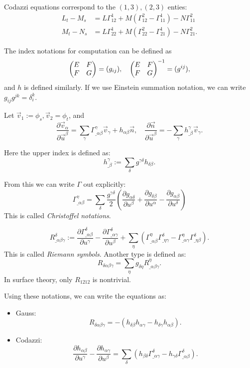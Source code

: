 Codazzi equations correspond to the $(1,3),(2,3)$ enties:
\begin{align*}
L_t - M_s &= L\Gamma_{12}^1 + M(\Gamma_{12}^2 - \Gamma_{11}^1) - N\Gamma_{11}^2\\
M_t - N_s &= L\Gamma_{22}^1 + M(\Gamma_{22}^2 - \Gamma_{21}^1) - N\Gamma_{21}^2.
\end{align*}

\begin{remark}
    The index notations for computation can be defined as
	\[
	\begin{pmatrix} E&F\\F&G \end{pmatrix} = (g_{ij}),\quad \begin{pmatrix} E&F\\F&G \end{pmatrix}^{-1} = (g^{ij}),
	\]
	and $h$ is defined similarly.
	If we use Einstein summation notation, we can write $g_{ij}g^{jk} = \delta_i^k$.

	Let $\vec{v}_1 := \phi_s, \vec{v}_2 = \phi_t$,
	and
	\[
		\frac{\partial \vec{v}_\alpha}{\partial \vec{u}^\beta}
		= \sum_{\gamma} \Gamma_{\_\alpha\beta}^\gamma \vec{v}_\gamma
		+ h_{\alpha\beta}\vec{n},\quad
		\frac{\partial \vec{n}}{\partial \vec{u}^\beta}
		= -\sum_{\gamma} h^\gamma_{\_\beta} \vec{v}_\gamma.
	\]

	Here the upper index is defined as:
	\[
	h^\gamma_{\_\beta} := \sum_{\delta} g^{\gamma\delta}h_{\delta\beta}.
	\]

	From this we can write $\Gamma$ out explicitly:
	\[
	\Gamma_{\_\alpha\beta}^\gamma = \sum_{\delta} \frac{g^{\gamma\delta}}{2}
	\left( \frac{\partial g_{\alpha\delta}}{\partial u^\beta}
	+ \frac{\partial g_{\delta\beta}}{\partial u^\alpha}
	- \frac{\partial g_{\alpha\beta}}{\partial u^\delta}\right)
	\]
	This is called \textit{Christoffel notations}.

	\[
	R_{\_\alpha\beta\gamma}^\delta := \frac{\partial \Gamma_{\_\alpha\beta}^\delta}{\partial u^\gamma} - \frac{\partial \Gamma_{\_\alpha\gamma}^\delta}{\partial u^\beta} + \sum_{\eta} (\Gamma_{\_\alpha\beta}^\eta \Gamma_{\_\eta\gamma}^\delta - \Gamma_{\_\alpha\gamma}^\eta\Gamma_{\_\eta\beta}^\delta).
	\]
	This is called \textit{Riemann symbols}. Another type is defined as:
	\[
	R_{\delta\alpha\beta\gamma} = \sum_{\eta} g_{\delta\eta}R_{\_\alpha\beta\gamma}^\eta.
	\]
	In surface theory, only $R_{1212}$ is nontrivial.
\end{remark}

Using these notations, we can write the equations as:
\begin{itemize}
	\item Gauss:
		\[
		R_{\delta\alpha\beta\gamma} = -(h_{\delta\beta}h_{\alpha\gamma} - h_{\delta\gamma}h_{\alpha\beta}).
		\]
	\item Codazzi:
		\[
		\frac{\partial h_{\alpha\beta}}{\partial u^\gamma} - \frac{\partial h_{\alpha\gamma}}{\partial u^\beta} = \sum_{\delta} (h_{\beta\delta}\Gamma_{\_\alpha\gamma}^\delta - h_{\gamma\delta}\Gamma_{\_\alpha\beta}^\delta).
		\]
		
\end{itemize}
